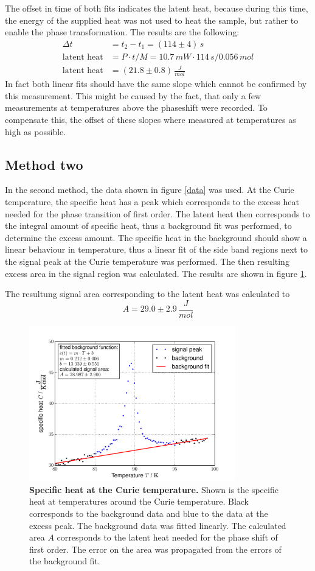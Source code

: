 \documentclass{include/thesisclass3}
\newcommand{\e}[1]{\,\si{#1}}
\begin{document}
The offset in time of both fits indicates the latent heat, because during this time, the energy of the supplied heat was not used to heat the sample, but rather to enable the phase transformation. The results are the following:
\begin{align}
\Delta t &= t_2-t_1=(114\pm 4)\e{s}\\
\textrm{latent heat} &= P \cdot t / M=10.7\e{mW}\cdot 114\e{s}/0.056\e{mol} \\
\textrm{latent heat} &= (21.8 \pm 0.8)\e{\frac{J}{mol}}
\end{align}
In fact both linear fits should have the same slope which cannot be confirmed by this measurement. This might be caused by the fact, that only a few measurements at temperatures above the phaseshift were recorded. To compensate this, the offset of these slopes where measured at temperatures as high as possible.
\subsection{Method two}
In the second method, the data shown in figure \ref{data} was used. 
At the Curie temperature, the specific heat has a peak which corresponds to the excess heat needed for the phase transition of first order.
The latent heat then corresponds to the integral amount of specific heat, thus a background fit was performed, to determine the excess amount.
The specific heat in the background should show a linear behaviour in temperature, thus a linear fit of the side band regions next to the signal peak at the Curie temperature was performed.
The then resulting excess area in the signal region was calculated.
The results are shown in figure \ref{area}.

The resultung signal area corresponding to the latent heat was calculated to
\[ A = 29.0 \pm 2.9 \e{\frac{J}{mol}}\]
\begin{figure}[h]
\includegraphics[width = 0.8\textwidth]{fig/latentheat_area.pdf}
\caption{\label{area}\textbf{Specific heat at the Curie temperature.} Shown is the specific heat at temperatures around the Curie temperature. Black corresponds to the background data and blue to the data at the excess peak. The background data was fitted linearly. The calculated area $A$ corresponds to the latent heat needed for the phase shift of first order. The error on the area was propagated from the errors of the background fit.}
\end{figure}
\end{document}

